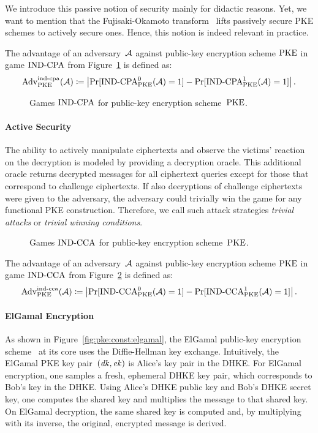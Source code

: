 We introduce this passive notion of security mainly for didactic reasons.
Yet, we want to mention that the Fujisaki-Okamoto transform~\cite{C:FujOka99} lifts passively secure PKE schemes to actively secure ones.
Hence, this notion is indeed relevant in practice.

The advantage of an adversary~$\mathcal{A}$ against public-key encryption scheme $\mathrm{PKE}$ in game ${\mathrm{IND}\text{-}\mathrm{CPA}}$ from Figure~\ref{fig:pke:ind:cpa} is defined as:
\[
\mathrm{Adv}_{\mathrm{PKE}}^{\mathrm{ind}\text{-}\mathrm{cpa}}(\mathcal{A})\coloneqq\left|\Pr[{\mathrm{IND}\text{-}\mathrm{CPA}}_{\mathrm{PKE}}^0(\mathcal{A})=1]-\Pr[{\mathrm{IND}\text{-}\mathrm{CPA}}_{\mathrm{PKE}}^1(\mathcal{A})=1]\right|\text{.}
\]

\begin{figure}[!ht]
    \centering
    \nicoresetlinenr%
    \fbox{%
        \scalebox{\codescalefactor}{%
        }%
    }
    \caption{%
        Games ${\mathrm{IND}\text{-}\mathrm{CPA}}$ for public-key encryption scheme~$\mathrm{PKE}$.
    }
    \label{fig:pke:ind:cpa}
\end{figure}

\paragraph{Active Security}
The ability to actively manipulate ciphertexts and observe the victims' reaction on the decryption is modeled by providing a decryption oracle.
This additional oracle returns decrypted messages for all ciphertext queries except for those that correspond to challenge ciphertexts.
If also decryptions of challenge ciphertexts were given to the adversary, the adversary could trivially win the game for any functional PKE construction.
Therefore, we call such attack strategies \emph{trivial attacks} or \emph{trivial winning conditions}.

\begin{figure}[!ht]
    \centering
    \nicoresetlinenr%
    \fbox{%
        \scalebox{\codescalefactor}{%
        }%
    }
    \caption{%
        Games ${\mathrm{IND}\text{-}\mathrm{CCA}}$ for public-key encryption scheme~$\mathrm{PKE}$.
    }
    \label{fig:pke:ind}
\end{figure}

The advantage of an adversary~$\mathcal{A}$ against public-key encryption scheme $\mathrm{PKE}$ in game ${\mathrm{IND}\text{-}\mathrm{CCA}}$ from Figure~\ref{fig:pke:ind} is defined as:
\[
\mathrm{Adv}_{\mathrm{PKE}}^{\mathrm{ind}\text{-}\mathrm{cca}}(\mathcal{A})\coloneqq\left|\Pr[{\mathrm{IND}\text{-}\mathrm{CCA}}_{\mathrm{PKE}}^0(\mathcal{A})=1]-\Pr[{\mathrm{IND}\text{-}\mathrm{CCA}}_{\mathrm{PKE}}^1(\mathcal{A})=1]\right|\text{.}
\]

\paragraph{ElGamal Encryption}
As shown in Figure~\ref{fig:pke:const:elgamal}, the ElGamal public-key encryption scheme~\cite{ElGamal85} at its core uses the Diffie-Hellman key exchange.
Intuitively, the ElGamal PKE key pair~$(\mathit{dk},\mathit{ek})$ is Alice's key pair in the DHKE.
For ElGamal encryption, one samples a fresh, ephemeral DHKE key pair, which corresponds to Bob's key in the DHKE.
Using Alice's DHKE public key and Bob's DHKE secret key, one computes the shared key and multiplies the message to that shared key.
On ElGamal decryption, the same shared key is computed and, by multiplying with its inverse, the original, encrypted message is derived.

